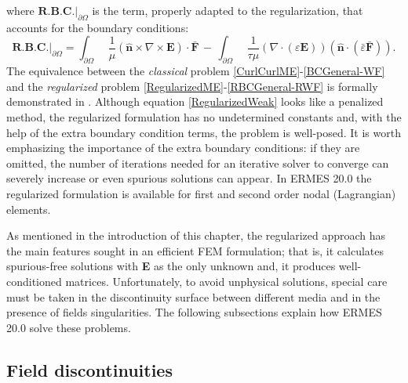 where $\textbf{R.B.C.}|_{\partial\Omega}$ is the term, properly adapted to the regularization, that accounts for the boundary conditions:
\begin{equation}\label{RBCGeneral-RWF}
	\textbf{R.B.C.}|_{\partial\Omega} = \int_{\partial\Omega}\enspace\frac{1}{\mu}\left(\mathbf{\hat{n}}\times\nabla\times\mathbf{E}\right)\cdot\mathbf{\bar{F}}\, - \,\int_{\partial\Omega}\enspace\frac{1}{\tau\mu}\left(\nabla\cdot\left(\varepsilon\mathbf{E}\right)\right)\left(\mathbf{\hat{n}}\cdot\left(\bar{\varepsilon}\mathbf{\bar{F}}\right)\right).
\end{equation}
The equivalence between the \emph{classical} problem \eqref{CurlCurlME}-\eqref{BCGeneral-WF} and the \emph{regularized} problem \eqref{RegularizedME}-\eqref{RBCGeneral-RWF} is formally demonstrated in \cite{BC-OJOOut}. Although equation \eqref{RegularizedWeak} looks like a penalized method, the regularized formulation has no undetermined constants and, with the help of the extra boundary condition terms, the problem is well-posed. It is worth emphasizing the importance of the extra boundary conditions: if they are omitted, the number of iterations needed for an iterative solver to converge can severely increase or even spurious solutions can appear. In ERMES 20.0 the regularized formulation is available for first and second order nodal (Lagrangian) elements.

As mentioned in the introduction of this chapter, the regularized approach has the main features sought in an efficient FEM formulation; that is, it calculates spurious-free solutions with \textbf{E} as the only unknown and, it produces well-conditioned matrices. Unfortunately, to avoid unphysical solutions, special care must be taken in the discontinuity surface between different media and in the presence of fields singularities. The following subsections explain how ERMES 20.0 solve these problems. 

\subsection{Field discontinuities}\label{Discontinuities}

